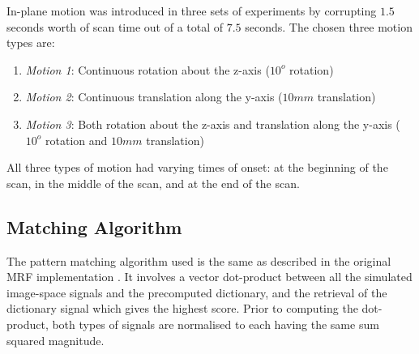 In-plane motion was introduced in three sets of experiments by corrupting $1.5$ seconds worth of scan time out of a total of $7.5$ seconds.
The chosen three motion types are:
\begin{enumerate}
    \item \textit{Motion 1}: Continuous rotation about the z-axis ($10^o$ rotation)
    \item \textit{Motion 2}: Continuous translation along the y-axis ($10mm$ translation)
    \item \textit{Motion 3}: Both rotation about the z-axis and translation along the y-axis ($10^o$ rotation and $10mm$ translation)
\end{enumerate}

All three types of motion had varying times of onset: at the beginning of the scan, in the middle of the scan, and at the end of the scan.




\hfill

\subsection{Matching Algorithm}
\label{method:matching}

The pattern matching algorithm used is the same as described in the original MRF implementation \cite{Ma2013}.
It involves a vector dot-product between all the simulated image-space signals and the precomputed dictionary, and the retrieval of the dictionary signal which gives the highest score.
Prior to computing the dot-product, both types of signals are normalised to each having the same sum squared magnitude.

